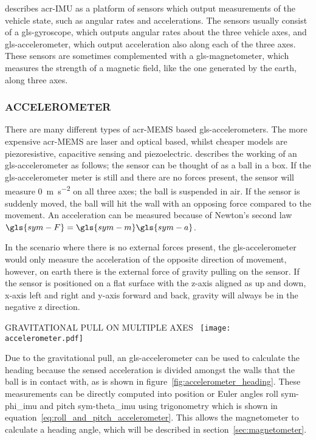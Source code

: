 \citet{leccadito_kalman_2013} describes \gls{acr-IMU} as a platform of sensors which output measurements of the
vehicle state, such as angular rates and accelerations. The sensors usually consist of a \gls{gls-gyroscope}, which
outputs angular rates about the three vehicle axes, and \gls{gls-accelerometer}, which output acceleration also along
each of the three axes. These sensors are sometimes complemented with a \gls{gls-magnetometer}, which measures the
strength of a magnetic field, like the one generated by the earth, along three axes.

\subsubsection{ACCELEROMETER}

There are many different types of \gls{acr-MEMS} based \glspl{gls-accelerometer}. The more expensive \gls{acr-MEMS} 
are laser and optical based, whilst cheaper models are piezoresistive, capacitive sensing and piezoelectric. 
\citet{leccadito_kalman_2013} describes the working of an \gls{gls-accelerometer} as follows; the sensor can be 
thought of as a ball in a box. If the \gls{gls-accelerometer} meter is still and there are no forces present, the 
sensor will measure \SI{0}{\meter\per\second\squared} on all three axes; the ball is suspended in air. If the sensor 
is suddenly moved, the ball will hit the wall with an opposing force compared to the movement. An acceleration can be
measured because of Newton's second law \( \gls{sym-F} = \gls{sym-m}  \gls{sym-a}  \).

In the scenario where there is no external forces present, the \gls{gls-accelerometer} would only measure the
acceleration of the opposite direction of movement, however, on earth there is the external force of gravity pulling on
the sensor. If the sensor is positioned on a flat surface with the z-axis aligned as up and down, x-axis left and right
and y-axis forward and back, gravity will always be in the negative z direction.

\begin{RoyalFigure}[!htb, label=fig:accelerometer_heading]{GRAVITATIONAL PULL ON MULTIPLE
AXES~\cite{leccadito_kalman_2013}}
    \texttt{[image: accelerometer.pdf]}
\end{RoyalFigure}

Due to the gravitational pull, an \gls{gls-accelerometer} can be used to calculate the heading because the sensed 
acceleration is divided amongst the walls that the ball is in contact with, as is shown in 
figure~\ref{fig:accelerometer_heading}. These measurements can be directly computed into position or Euler angles 
roll \gls{sym-phi_imu} and pitch \gls{sym-theta_imu} using trigonometry which is shown in 
equation~\ref{eq:roll_and_pitch_accelerometer}. This allows the magnetometer to calculate a heading angle, which will
be described in section~\ref{sec:magnetometer}.

